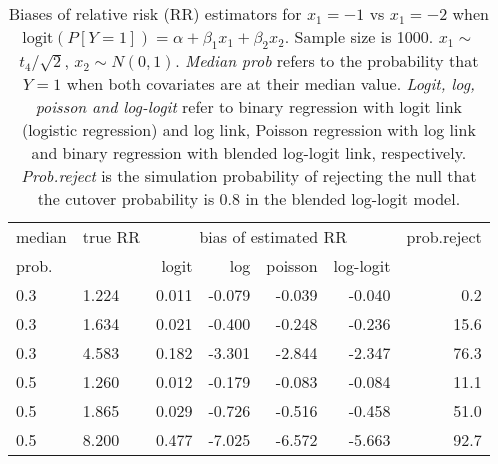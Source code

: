 \documentclass[12pt,a4paper]{article}
\begin{document}
\begin{table}[H] 
\small\sf\centering 
\caption{Biases of relative risk (RR) estimators for $x_1=-1$ vs $x_1=-2$ when $\mbox{logit}(P[Y=1])=\alpha+\beta_1 x_1 + \beta_2 x_2$. Sample size is 1000. $x_1 \sim $$t_4/\sqrt{2}$, $x_2 \sim N(0,1)$. {\it Median prob} refers to the probability that $Y=1$ when both covariates are at their median value. {\it Logit, log, poisson and log-logit} refer to binary regression with logit link (logistic regression) and log link, Poisson regression with log link and binary regression with blended log-logit link, respectively. {\it Prob.reject} is the simulation probability of rejecting the null that the cutover probability is $0.8$ in the blended log-logit model.} 
\begin{tabular}{llrrrrr} 
\toprule 
median & true RR & \multicolumn{4}{c}{bias of estimated RR} & prob.reject \\ 
prob. & & logit & log & poisson & log-logit  & \\ \midrule 
0.3 & 1.224 & 0.011 & -0.079 & -0.039 & -0.040 &  0.2 \\  
0.3 & 1.634 & 0.021 & -0.400 & -0.248 & -0.236 & 15.6 \\  
0.3 & 4.583 & 0.182 & -3.301 & -2.844 & -2.347 & 76.3 \\  
0.5 & 1.260 & 0.012 & -0.179 & -0.083 & -0.084 & 11.1 \\  
0.5 & 1.865 & 0.029 & -0.726 & -0.516 & -0.458 & 51.0 \\  
0.5 & 8.200 & 0.477 & -7.025 & -6.572 & -5.663 & 92.7 \\  
\bottomrule 
\end{tabular} 
\end{table} 
\end{document}
